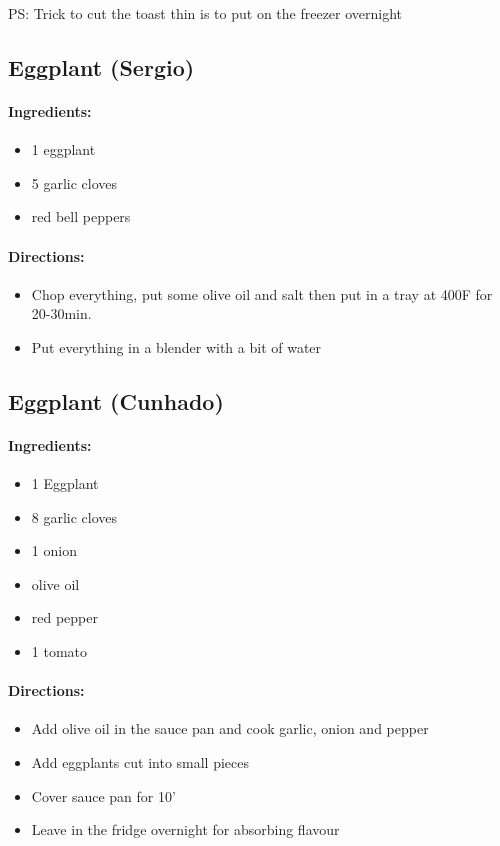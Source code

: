 \documentclass{article}
\begin{document}
PS: Trick to cut the toast thin is to put on the freezer overnight


\subsection{Eggplant (Sergio)}

\paragraph{Ingredients:}

\begin{itemize}
	\item 1 eggplant
	\item 5 garlic cloves
	\item red bell peppers
\end{itemize}

\paragraph{Directions:}
\begin{itemize}
	\item Chop everything, put some olive oil and salt then put in a tray at 400F for 20-30min.
	\item Put everything in a blender with a bit of water 
\end{itemize}

\subsection{Eggplant (Cunhado)}

\paragraph{Ingredients:}

\begin{itemize}
	\item 1 Eggplant
	\item 8 garlic cloves
	\item 1 onion
	\item olive oil
	\item red pepper
	\item 1 tomato
\end{itemize}

\paragraph{Directions:}
\begin{itemize}
	\item Add olive oil in the sauce pan and cook garlic, onion and pepper
	\item Add eggplants cut into small pieces
	\item Cover sauce pan for 10'
	\item Leave in the fridge overnight for absorbing flavour
\end{itemize}
\end{document}
